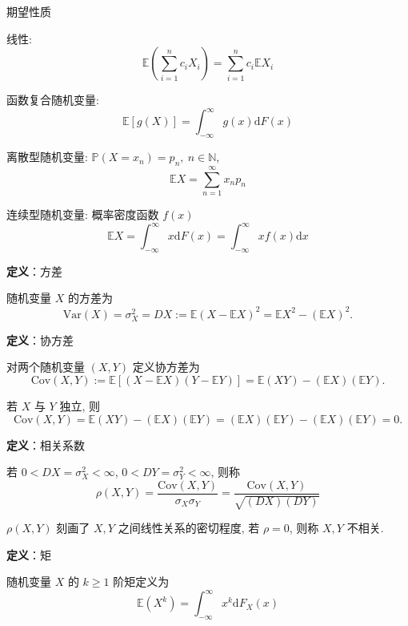 \documentclass[openany]{ctexbook}
\theoremstyle{kaiti}
\theoremstyle{normal}
\begin{document}
期望性质

线性:
\begin{equation}
  \mathbb{E}\left(\sum_{i=1}^nc_iX_i\right)=\sum_{i=1}^nc_i\mathbb{E}X_i
\end{equation}

函数复合随机变量:
\begin{equation}
  \mathbb{E}[g(X)]=\int_{-\infty}^\infty g(x)\mathrm{d}F(x)
\end{equation}

离散型随机变量: $\mathbb{P}(X=x_n)=p_n,~n\in\mathbb{N}$,
\begin{equation}
  \mathbb{E}X=\sum_{n=1}^\infty x_np_n
\end{equation}

连续型随机变量: 概率密度函数 $f(x)$
\begin{equation}
  \mathbb{E}X=\int_{-\infty}^\infty x\mathrm{d}F(x)=\int_{-\infty}^\infty xf(x)\mathrm{d}x
\end{equation}

\textbf{定义}：方差

随机变量 $X$ 的方差为
\begin{equation}
  \mathrm{Var}(X)=\sigma_X^2=DX:= \mathbb{E}(X-\mathbb{E}X)^2=\mathbb{E}X^2-(\mathbb{E}X)^2.
\end{equation}

\textbf{定义}：协方差

对两个随机变量 $(X,Y)$ 定义协方差为
\begin{equation}
  \mathrm{Cov}(X,Y):= \mathbb{E}[(X-\mathbb{E}X)(Y-\mathbb{E}Y)]=\mathbb{E}(XY)-(\mathbb{E}X)(\mathbb{E}Y).
\end{equation}
 

若 $X$ 与 $Y$ 独立, 则
\begin{equation}
  \mathrm{Cov}(X,Y)=\mathbb{E}(XY)-(\mathbb{E}X)(\mathbb{E}Y)=(\mathbb{E}X)(\mathbb{E}Y)-(\mathbb{E}X)(\mathbb{E}Y)=0.
\end{equation}

\textbf{定义}：相关系数

若 $0<DX=\sigma_X^2<\infty$, $0<DY=\sigma_Y^2<\infty$, 则称
\begin{equation}
  \rho(X,Y)=\frac{\mathrm{Cov}(X,Y)}{\sigma_X\sigma_Y}=\frac{\mathrm{Cov}(X,Y)}{\sqrt{(DX)(DY)}}
\end{equation}

$\rho(X,Y)$ 刻画了 $X,Y$ 之间线性关系的密切程度, 若 $\rho=0$, 则称 $X,Y$ 不相关.

\textbf{定义}：矩

随机变量 $X$ 的 $k\geqslant1$ 阶矩定义为
\begin{equation}
  \mathbb{E}(X^k)=\int_{-\infty}^\infty x^k\mathrm{d}F_X(x)
\end{equation}
\end{document}
